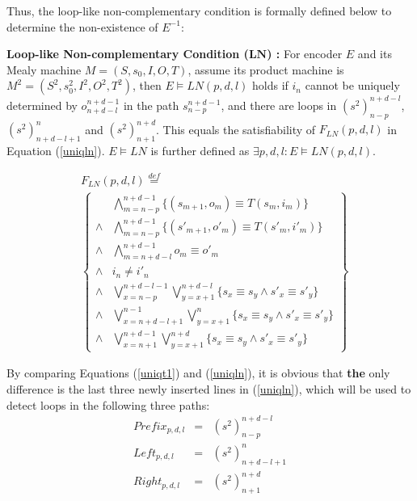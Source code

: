\documentclass[journal]{IEEEtran}
\begin{document}
Thus,
the loop-like non-complementary condition is formally defined below to determine the non-existence of $E^{-1}$:

\begin{definition11}\label{def_lnc}%
\textbf{Loop-like Non-complementary Condition ($\boldsymbol{LN}$) :}
For encoder $E$ and its Mealy machine $M=(S,s_0,I,O,T)$,
assume its product machine is $M^2=(S^2,s_0^2,I^2,O^2,T^2)$,
then $E\vDash LN(p,d,l)$ holds if
$i_n$ cannot be uniquely determined by $o_{n+d-l}^{n+d-1}$ in the path $s_{n-p}^{n+d-1}$,
and there are loops in $(s^2)_{n-p}^{n+d-l}$,$(s^2)_{n+d-l+1}^n$ and $(s^2)_{n+1}^{n+d}$.
This equals the satisfiability of $F_{LN}(p,d,l)$ in Equation (\ref{uniqln}).
$E\vDash LN$ is further defined as $\exists p,d,l:E\vDash LN(p,d,l)$.
\end{definition11}


\begin{equation}\label{uniqln}
\begin{split}
&F_{LN}(p,d,l)\overset{def}{=}\\
&\left\{
\begin{array}{cc}
&\bigwedge_{m=n-p}^{n+d-1}
\{
(s_{m+1},o_m)\equiv T(s_m,i_m)
\}
\\
\wedge&\bigwedge_{m=n-p}^{n+d-1}
\{
(s'_{m+1},o'_m)\equiv T(s'_m,i'_m)
\}
\\
\wedge&\bigwedge_{m=n+d-l}^{n+d-1}o_m\equiv o'_m \\
\wedge& i_n\ne i'_n \\
\wedge&\bigvee_{x=n-p}^{n+d-l-1}\bigvee_{y=x+1}^{n+d-l} \{s_x\equiv s_y\wedge s'_x\equiv s'_y\} \\
\wedge&\bigvee_{x=n+d-l+1}^{n-1}\bigvee_{y=x+1}^{n} \{s_x\equiv s_y\wedge s'_x\equiv s'_y\} \\
\wedge&\bigvee_{x=n+1}^{n+d-1}\bigvee_{y=x+1}^{n+d} \{s_x\equiv s_y\wedge s'_x\equiv s'_y\}
\end{array}
\right\}
\end{split}
\end{equation}

By comparing Equations (\ref{uniqt1}) and (\ref{uniqln}),
it is obvious that \textbf{the} only difference is the last three newly inserted lines in (\ref{uniqln}),
which will be used to detect loops in the following three paths:
\begin{equation}
\begin{array}{ccc}
Prefix_{p,d,l}&=&(s^2)_{n-p}^{n+d-l} \\
Left_{p,d,l}&=&(s^2)_{n+d-l+1}^n \\
Right_{p,d,l}&=&(s^2)_{n+1}^{n+d}
\end{array}
\end{equation}
\end{document}
